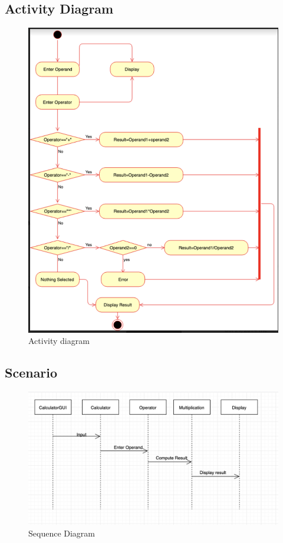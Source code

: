 \documentclass[12pt]{extarticle}
\begin{document}
\newpage
\subsection{Activity Diagram}

\begin{figure}[htb!]
  \includegraphics[width=1\textwidth]{activity.png}
  \centering
  \caption{Activity diagram}
\end{figure}

\newpage

\subsection{Scenario}

\begin{figure}[htb!]
  \includegraphics[width=1\textwidth]{sequencediagram.png}
  \centering
  \caption{Sequence Diagram}
\end{figure}
\end{document}
